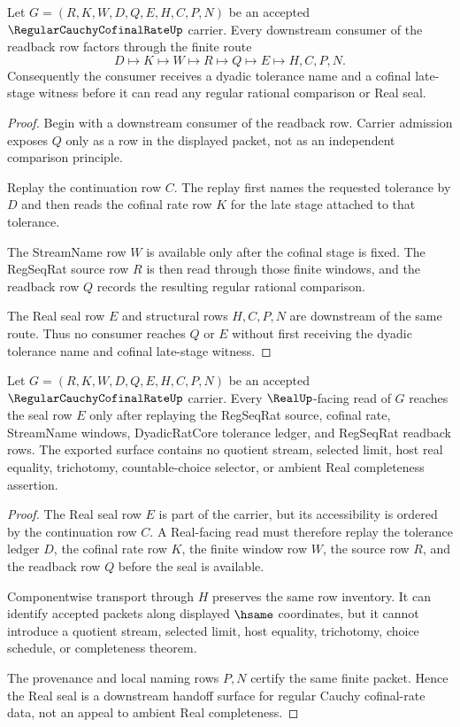 \begin{theorem}
\label{thm:regular-cauchy-cofinal-rate-downstream-route}
Let $G=(R,K,W,D,Q,E,H,C,P,N)$ be an accepted $\RegularCauchyCofinalRateUp$ carrier. Every downstream consumer of the readback row factors through the finite route
$$
D \longmapsto K \longmapsto W \longmapsto R \longmapsto Q \longmapsto E \longmapsto H,C,P,N .
$$
Consequently the consumer receives a dyadic tolerance name and a cofinal late-stage witness before it can read any regular rational comparison or Real seal.
\end{theorem}
\begin{proof}
Begin with a downstream consumer of the readback row. Carrier admission exposes $Q$ only as a row in the displayed packet, not as an independent comparison principle.

Replay the continuation row $C$. The replay first names the requested tolerance by $D$ and then reads the cofinal rate row $K$ for the late stage attached to that tolerance.

The StreamName row $W$ is available only after the cofinal stage is fixed. The RegSeqRat source row $R$ is then read through those finite windows, and the readback row $Q$ records the resulting regular rational comparison.

The Real seal row $E$ and structural rows $H,C,P,N$ are downstream of the same route. Thus no consumer reaches $Q$ or $E$ without first receiving the dyadic tolerance name and cofinal late-stage witness.
\end{proof}

\begin{theorem}
\label{thm:regular-cauchy-cofinal-rate-real-seal-handoff}
Let $G=(R,K,W,D,Q,E,H,C,P,N)$ be an accepted $\RegularCauchyCofinalRateUp$ carrier. Every $\RealUp$-facing read of $G$ reaches the seal row $E$ only after replaying the RegSeqRat source, cofinal rate, StreamName windows, DyadicRatCore tolerance ledger, and RegSeqRat readback rows. The exported surface contains no quotient stream, selected limit, host real equality, trichotomy, countable-choice selector, or ambient Real completeness assertion.
\end{theorem}
\begin{proof}
The Real seal row $E$ is part of the carrier, but its accessibility is ordered by the continuation row $C$. A Real-facing read must therefore replay the tolerance ledger $D$, the cofinal rate row $K$, the finite window row $W$, the source row $R$, and the readback row $Q$ before the seal is available.

Componentwise transport through $H$ preserves the same row inventory. It can identify accepted packets along displayed $\hsame$ coordinates, but it cannot introduce a quotient stream, selected limit, host equality, trichotomy, choice schedule, or completeness theorem.

The provenance and local naming rows $P,N$ certify the same finite packet. Hence the Real seal is a downstream handoff surface for regular Cauchy cofinal-rate data, not an appeal to ambient Real completeness.
\end{proof}

